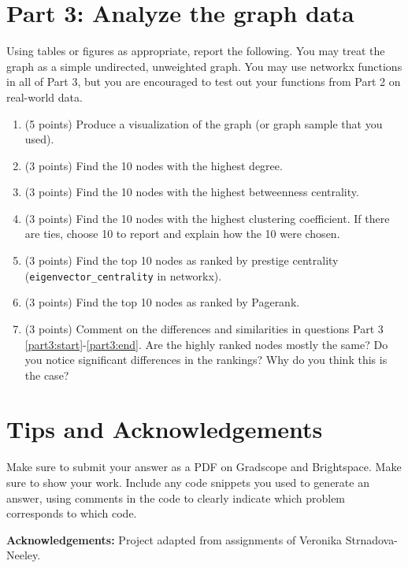 \documentclass[11pt]{article}
\begin{document}
\section*{Part 3: Analyze the graph data}

Using tables or figures as appropriate, report the following.  You may treat the
graph as a simple undirected, unweighted graph. You may use networkx functions
in all of Part 3, but you are encouraged to test out your functions from Part 2
on real-world data.

\begin{enumerate}

    \item (5 points) Produce a visualization of the graph (or graph sample that
    you used). \label{part3:start}

    \item (3 points) Find the 10 nodes with the highest degree.

    \item (3 points) Find the 10 nodes with the highest betweenness centrality.

    \item (3 points) Find the 10 nodes with the highest clustering coefficient.
    If there are ties, choose 10 to report and explain how the 10 were chosen.

    \item (3 points) Find the top 10 nodes as ranked by prestige centrality
    ({\tt eigenvector\_centrality} in networkx).

    \item (3 points) Find the top 10 nodes as ranked by Pagerank.
    \label{part3:end}

    \item (3 points) Comment on the differences and similarities in questions
    Part 3 \ref{part3:start}-\ref{part3:end}. Are the highly ranked nodes mostly the
    same? Do you notice significant differences in the rankings? Why do you
    think this is the case?

\end{enumerate}

\section*{Tips and Acknowledgements}

Make sure to submit your answer as a PDF on Gradscope and Brightspace. Make sure
to show your work. Include any code snippets you used to generate an answer,
using comments in the code to clearly indicate which problem corresponds to
which code.

{\bf Acknowledgements:} Project adapted from assignments of Veronika
Strnadova-Neeley.
\end{document}
